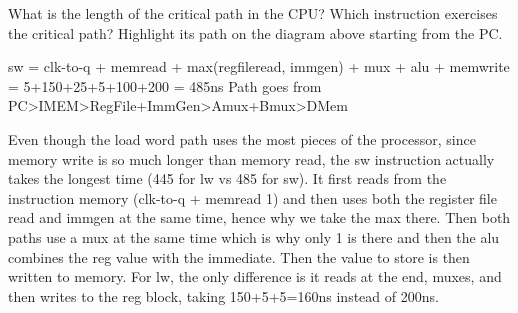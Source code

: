 \begin{blocksection}
\question
What is the length of the critical path in the CPU? Which instruction exercises the critical path?  Highlight its path on the diagram above starting from the PC.
\newline
\newline
\newline

\begin{solution}[0.5in]
sw = clk-to-q + memread + max(regfileread, immgen) + mux + alu + memwrite \\
= 5+150+25+5+100+200 = 485ns
Path goes from PC>IMEM>RegFile+ImmGen>Amux+Bmux>DMem

Even though the load word path uses the most pieces of the processor, since memory write is so much longer than memory read, the sw instruction actually takes the longest time (445 for lw vs 485 for sw).  It first reads from the instruction memory (clk-to-q + memread 1) and then uses both the register file read and immgen at the same time, hence why we take the max there.  Then both paths use a mux at the same time which is why only 1 is there and then the alu combines the reg value with the immediate.  Then the value to store is then written to memory.  For lw, the only difference is it reads at the end, muxes, and then writes to the reg block, taking 150+5+5=160ns instead of 200ns.

\end{solution}

\end{blocksection}


